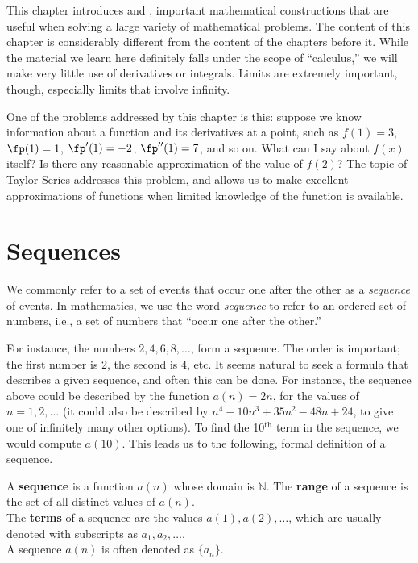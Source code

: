This chapter introduces  and , important mathematical constructions that are useful when solving a large variety of mathematical problems. The content of this chapter is considerably different from the content of the chapters before it. While the material we learn here definitely falls under the scope of ``calculus,'' we will make very little use of derivatives or integrals. Limits are extremely important, though, especially limits that involve infinity. 

One of the problems addressed by this chapter is this: suppose we know information about a function and its derivatives at a point, such as  $f(1) = 3$, $\fp(1) = 1$, $\fp'(1) = -2$, $\fp''(1) = 7$, and so on. What can I say about $f(x)$ itself? Is there any reasonable approximation of the value of $f(2)$? The topic of Taylor Series addresses this problem, and allows us to make excellent approximations of functions when limited knowledge of the function is available.

\section{Sequences}\label{sec:sequences}

We commonly refer to a set of events that occur one after the other as a \textit{sequence} of events. In mathematics, we use the word \textit{sequence} to refer to an ordered set of numbers, i.e., a set of numbers that ``occur one after the other.''

For instance, the numbers $2, 4, 6, 8, \dotsc$, form a sequence. The order is important; the first number is 2, the second is 4, etc. It seems natural to seek a formula that describes a given sequence, and often this can be done. For instance, the sequence above could be described by the function $a(n) = 2n$, for the values of $n = 1, 2, \dotsc$ (it could also be described by $n^4-10 n^3+35 n^2-48n+24$, to give one of infinitely many other options). To find the 10$^\text{th}$ term in the sequence, we would compute $a(10)$. This leads us to the following, formal definition of a sequence.


{A \textbf{sequence} is a function $a(n)$ whose domain is $\mathbb{N}$. The \textbf{range} of a sequence is the set of all distinct values of $a(n)$.
\\

The \textbf{terms} of a sequence are the values $a(1), a(2), \dotsc$, which are usually denoted with subscripts as $a_1, a_2, \dotsc$.\\

A sequence $a(n)$ is often denoted as $\{a_n\}$.}

